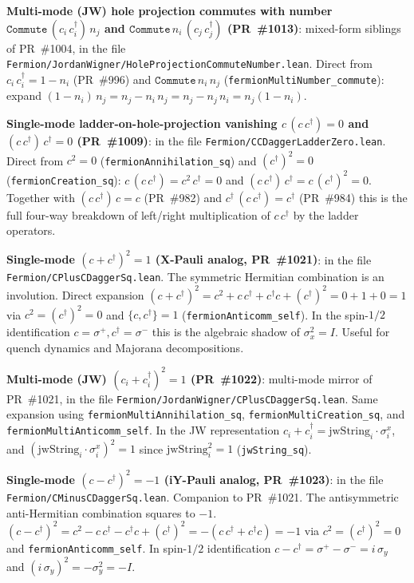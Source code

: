 \documentclass[a4paper,11pt]{article}
\begin{document}
\textbf{Multi-mode (JW) hole projection commutes with number
$\texttt{Commute}\,(c_i\,c_i^\dagger)\,n_j$ and
$\texttt{Commute}\,n_i\,(c_j\,c_j^\dagger)$ (PR~\#1013)}:
mixed-form siblings of PR~\#1004, in the file
\texttt{Fermion/JordanWigner/HoleProjectionCommuteNumber.lean}.
Direct from $c_i\,c_i^\dagger = 1 - n_i$ (PR~\#996) and
$\texttt{Commute}\,n_i\,n_j$
(\texttt{fermionMultiNumber\_commute}): expand
$(1 - n_i)\,n_j = n_j - n_i\,n_j = n_j - n_j\,n_i = n_j(1 -
n_i)$.

\textbf{Single-mode ladder-on-hole-projection vanishing
$c\,(c\,c^\dagger) = 0$ and $(c\,c^\dagger)\,c^\dagger = 0$
(PR~\#1009)}: in the file
\texttt{Fermion/CCDaggerLadderZero.lean}. Direct from
$c^2 = 0$ (\texttt{fermionAnnihilation\_sq}) and
$(c^\dagger)^2 = 0$ (\texttt{fermionCreation\_sq}):
$c\,(c\,c^\dagger) = c^2\,c^\dagger = 0$ and
$(c\,c^\dagger)\,c^\dagger = c\,(c^\dagger)^2 = 0$. Together
with $(c\,c^\dagger)\,c = c$ (PR~\#982) and $c^\dagger\,
(c\,c^\dagger) = c^\dagger$ (PR~\#984) this is the full
four-way breakdown of left/right multiplication of
$c\,c^\dagger$ by the ladder operators.

\textbf{Single-mode $(c + c^\dagger)^2 = 1$ (X-Pauli analog,
PR~\#1021)}: in the file
\texttt{Fermion/CPlusCDaggerSq.lean}. The symmetric Hermitian
combination is an involution. Direct expansion
$(c + c^\dagger)^2 = c^2 + c\,c^\dagger + c^\dagger c +
(c^\dagger)^2 = 0 + 1 + 0 = 1$ via $c^2 = (c^\dagger)^2 = 0$
and $\{c, c^\dagger\} = 1$
(\texttt{fermionAnticomm\_self}). In the spin-$1/2$ identification
$c = \sigma^+, c^\dagger = \sigma^-$ this is the algebraic
shadow of $\sigma_x^2 = I$. Useful for quench dynamics and
Majorana decompositions.

\textbf{Multi-mode (JW) $(c_i + c_i^\dagger)^2 = 1$
(PR~\#1022)}: multi-mode mirror of PR~\#1021, in the file
\texttt{Fermion/JordanWigner/CPlusCDaggerSq.lean}. Same
expansion using \texttt{fermionMultiAnnihilation\_sq},
\texttt{fermionMultiCreation\_sq}, and
\texttt{fermionMultiAnticomm\_self}. In the JW representation
$c_i + c_i^\dagger = \mathrm{jwString}_i \cdot \sigma^x_i$, and
$(\mathrm{jwString}_i \cdot \sigma^x_i)^2 = 1$ since
$\mathrm{jwString}_i^2 = 1$ (\texttt{jwString\_sq}).

\textbf{Single-mode $(c - c^\dagger)^2 = -1$ (iY-Pauli analog,
PR~\#1023)}: in the file
\texttt{Fermion/CMinusCDaggerSq.lean}. Companion to PR~\#1021.
The antisymmetric anti-Hermitian combination squares to $-1$.
$(c - c^\dagger)^2 = c^2 - c\,c^\dagger - c^\dagger c + (c^\dagger)^2
= -(c\,c^\dagger + c^\dagger c) = -1$ via $c^2 = (c^\dagger)^2 = 0$
and \texttt{fermionAnticomm\_self}. In spin-$1/2$ identification
$c - c^\dagger = \sigma^+ - \sigma^- = i\,\sigma_y$ and
$(i\,\sigma_y)^2 = -\sigma_y^2 = -I$.
\end{document}
